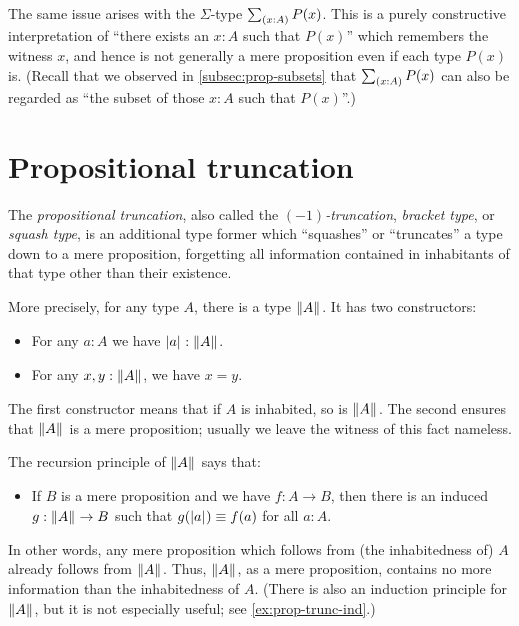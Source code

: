 %
The same issue arises with the $\Sigma$-type $\sm{x:A} P(x)$.
This is a purely constructive interpretation of ``there exists an $x:A$ such that $P(x)$'' which remembers the witness $x$, and hence is not generally a mere proposition even if each type $P(x)$ is.
(Recall that we observed in \autoref{subsec:prop-subsets} that $\sm{x:A} P(x)$ can also be regarded as ``the subset of those $x:A$ such that $P(x)$''.)


\section{Propositional truncation}
\label{subsec:prop-trunc}

%
%
%
%
%
The \emph{propositional truncation}, also called the \emph{$(-1)$-truncation}, \emph{bracket type}, or \emph{squash type}, is an additional type former which ``squashes'' or ``truncates'' a type down to a mere proposition, forgetting all information contained in inhabitants of that type other than their existence.

More precisely, for any type $A$, there is a type $\mathopen{}\left\Vert A\right\Vert_{}\mathclose{}$.
It has two constructors:
\begin{itemize}
\item For any $a:A$ we have $\mathopen{}\left|a\right|_{}^{}\mathclose{} : \mathopen{}\left\Vert A\right\Vert_{}\mathclose{}$.
\item For any $x,y:\mathopen{}\left\Vert A\right\Vert_{}\mathclose{}$, we have $x=y$.
\end{itemize}
The first constructor means that if $A$ is inhabited, so is $\mathopen{}\left\Vert A\right\Vert_{}\mathclose{}$.
The second ensures that $\mathopen{}\left\Vert A\right\Vert_{}\mathclose{}$ is a mere proposition; usually we leave the witness of this fact nameless.

%
The recursion principle of $\mathopen{}\left\Vert A\right\Vert_{}\mathclose{}$ says that:
\begin{itemize}
\item If $B$ is a mere proposition and we have $f:A\to B$, then there is an induced $g:\mathopen{}\left\Vert A\right\Vert_{}\mathclose{} \to B$ such that $g(\mathopen{}\left|a\right|_{}^{}\mathclose{}) \equiv f(a)$ for all $a:A$.
\end{itemize}
In other words, any mere proposition which follows from (the inhabitedness of) $A$ already follows from $\mathopen{}\left\Vert A\right\Vert_{}\mathclose{}$.
Thus, $\mathopen{}\left\Vert A\right\Vert_{}\mathclose{}$, as a mere proposition, contains no more information than the inhabitedness of $A$.
(There is also an induction principle for $\mathopen{}\left\Vert A\right\Vert_{}\mathclose{}$, but it is not especially useful; see \autoref{ex:prop-trunc-ind}.)


